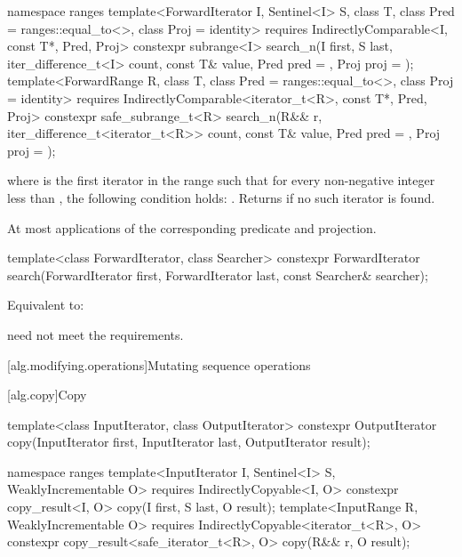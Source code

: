 %
\begin{itemdecl}
namespace ranges {
  template<ForwardIterator I, Sentinel<I> S, class T,
           class Pred = ranges::equal_to<>, class Proj = identity>
    requires IndirectlyComparable<I, const T*, Pred, Proj>
    constexpr subrange<I>
      search_n(I first, S last, iter_difference_t<I> count,
               const T& value, Pred pred = {}, Proj proj = {});
  template<ForwardRange R, class T, class Pred = ranges::equal_to<>,
           class Proj = identity>
    requires IndirectlyComparable<iterator_t<R>, const T*, Pred, Proj>
    constexpr safe_subrange_t<R>
      search_n(R&& r, iter_difference_t<iterator_t<R>> count,
               const T& value, Pred pred = {}, Proj proj = {});
}
\end{itemdecl}

\begin{itemdescr}
\pnum
\returns
{}
where  is the first iterator in the range 
such that for every non-negative integer  less than ,
the following condition holds:
.
Returns  if no such iterator is found.

\pnum
\complexity
At most  applications
of the corresponding predicate and projection.
\end{itemdescr}

%
\begin{itemdecl}
template<class ForwardIterator, class Searcher>
  constexpr ForwardIterator
    search(ForwardIterator first, ForwardIterator last, const Searcher& searcher);
\end{itemdecl}

\begin{itemdescr}
\pnum
\effects
Equivalent to: 

\pnum
\remarks
{} need not meet the  requirements.
\end{itemdescr}

[alg.modifying.operations]{Mutating sequence operations}

[alg.copy]{Copy}

%
\begin{itemdecl}
template<class InputIterator, class OutputIterator>
  constexpr OutputIterator copy(InputIterator first, InputIterator last,
                                OutputIterator result);

namespace ranges {
  template<InputIterator I, Sentinel<I> S, WeaklyIncrementable O>
    requires IndirectlyCopyable<I, O>
    constexpr copy_result<I, O>
      copy(I first, S last, O result);
  template<InputRange R, WeaklyIncrementable O>
    requires IndirectlyCopyable<iterator_t<R>, O>
    constexpr copy_result<safe_iterator_t<R>, O>
      copy(R&& r, O result);
}
\end{itemdecl}

